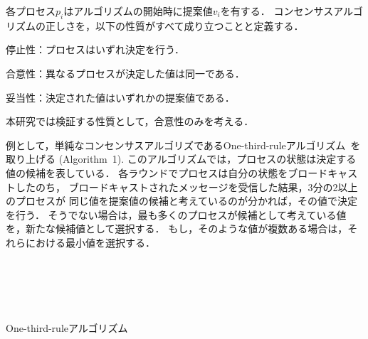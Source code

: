 \documentclass[technicalreport]{ieicej}
\theoremstyle{plain}
\begin{document}
各プロセス$p_i$はアルゴリズムの開始時に提案値$v_i$を有する．
コンセンサスアルゴリズムの正しさを，以下の性質がすべて成り立つことと定義する．

停止性：プロセスはいずれ決定を行う．

合意性：異なるプロセスが決定した値は同一である．

妥当性：決定された値はいずれかの提案値である．

本研究では検証する性質として，合意性のみを考える．


例として，単純なコンセンサスアルゴリズであるOne-third-ruleアルゴリズム~\cite{HOjournal}を取り上げる (Algorithm~1). 
このアルゴリズムでは，プロセスの状態は決定する値の候補を表している．
各ラウンドでプロセスは自分の状態をブロードキャストしたのち，
ブロードキャストされたメッセージを受信した結果，3分の2以上のプロセスが
同じ値を提案値の候補と考えているのが分かれば，その値で決定を行う．
そうでない場合は，最も多くのプロセスが候補として考えている値を，新たな候補値として選択する．
もし，そのような値が複数ある場合は，それらにおける最小値を選択する．
\begin{algorithm}[ht]
    \normalsize{
        \begin{distribalgo}[1]
           
             \\ 
            \ENDINDENT 
            \BLANK
            
             \\
             \\
{}
\ENDIF
            \ENDIF

            \ENDINDENT
            \caption{One-third-ruleアルゴリズム}
            \label{algo:bakery}
        \end{distribalgo}
    }
\end{algorithm}
\end{document}
